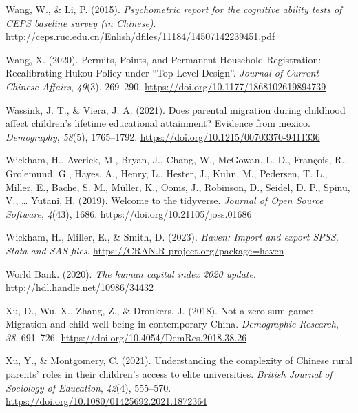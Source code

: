 \documentclass[
  man,floatsintext]{apa7}
\newlength{\cslhangindent}
\newlength{\cslentryspacingunit} %
\newenvironment{CSLReferences}[2] %
 {%
  \setlength{\parindent}{0pt}
  \ifodd #1
  \let\oldpar\par
  \def\par{\hangindent=\cslhangindent\oldpar}
  \fi
  \setlength{\parskip}{#2\cslentryspacingunit}
 }%
 {}
\begin{document}
\begin{CSLReferences}{1}{0}
\leavevmode{}%
Wang, W., \& Li, P. (2015). \emph{Psychometric report for the cognitive ability tests of {CEPS} baseline survey (in {Chinese})}. \url{http://ceps.ruc.edu.cn/Enlish/dfiles/11184/14507142239451.pdf}

\leavevmode{}%
Wang, X. (2020). Permits, Points, and Permanent Household Registration: Recalibrating Hukou Policy under {``}Top-Level Design{''}. \emph{Journal of Current Chinese Affairs}, \emph{49}(3), 269--290. \url{https://doi.org/10.1177/1868102619894739}

\leavevmode{}%
Wassink, J. T., \& Viera, J. A. (2021). Does parental migration during childhood affect children's lifetime educational attainment? Evidence from mexico. \emph{Demography}, \emph{58}(5), 1765--1792. \url{https://doi.org/10.1215/00703370-9411336}

\leavevmode{}%
Wickham, H., Averick, M., Bryan, J., Chang, W., McGowan, L. D., François, R., Grolemund, G., Hayes, A., Henry, L., Hester, J., Kuhn, M., Pedersen, T. L., Miller, E., Bache, S. M., Müller, K., Ooms, J., Robinson, D., Seidel, D. P., Spinu, V., \ldots{} Yutani, H. (2019). Welcome to the {tidyverse}. \emph{Journal of Open Source Software}, \emph{4}(43), 1686. \url{https://doi.org/10.21105/joss.01686}

\leavevmode{}%
Wickham, H., Miller, E., \& Smith, D. (2023). \emph{Haven: Import and export {SPSS}, {Stata} and {SAS} files}. \url{https://CRAN.R-project.org/package=haven}

\leavevmode{}%
World Bank. (2020). \emph{The human capital index 2020 update}. \url{http://hdl.handle.net/10986/34432}

\leavevmode{}%
Xu, D., Wu, X., Zhang, Z., \& Dronkers, J. (2018). Not a zero-sum game: Migration and child well-being in contemporary {China}. \emph{Demographic Research}, \emph{38}, 691--726. \url{https://doi.org/10.4054/DemRes.2018.38.26}

\leavevmode{}%
Xu, Y., \& Montgomery, C. (2021). Understanding the complexity of Chinese rural parents{'} roles in their children{'}s access to elite universities. \emph{British Journal of Sociology of Education}, \emph{42}(4), 555--570. \url{https://doi.org/10.1080/01425692.2021.1872364}


\end{CSLReferences}
\end{document}
